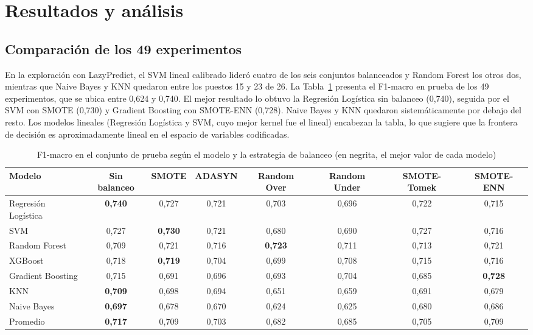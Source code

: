 \documentclass[conference]{IEEEtran}
\begin{document}
\section{Resultados y análisis}\label{sec:resultados}

\subsection{Comparación de los 49 experimentos}

En la exploración con LazyPredict, el SVM lineal calibrado lideró cuatro de los seis conjuntos balanceados y Random Forest los otros dos, mientras que Naive Bayes y KNN quedaron entre los puestos 15 y 23 de 26. La Tabla~\ref{tab:f1} presenta el F1-macro en prueba de los 49 experimentos, que se ubica entre 0,624 y 0,740. El mejor resultado lo obtuvo la Regresión Logística sin balanceo (0,740), seguida por el SVM con SMOTE (0,730) y Gradient Boosting con SMOTE-ENN (0,728). Naive Bayes y KNN quedaron sistemáticamente por debajo del resto. Los modelos lineales (Regresión Logística y SVM, cuyo mejor kernel fue el lineal) encabezan la tabla, lo que sugiere que la frontera de decisión es aproximadamente lineal en el espacio de variables codificadas.

\begin{table}[!t]
\caption{F1-macro en el conjunto de prueba según el modelo y la estrategia de balanceo (en negrita, el mejor valor de cada modelo)}
\label{tab:f1}
\centering
\footnotesize
\begin{tabular}{@{}lccccccc@{}}
\toprule
Modelo & Sin balanceo & SMOTE & ADASYN & Random Over & Random Under & SMOTE-Tomek & SMOTE-ENN \\
\midrule
Regresión Logística & \textbf{0,740} & 0,727 & 0,721 & 0,703 & 0,696 & 0,722 & 0,715 \\
SVM & 0,727 & \textbf{0,730} & 0,721 & 0,680 & 0,690 & 0,727 & 0,716 \\
Random Forest & 0,709 & 0,721 & 0,716 & \textbf{0,723} & 0,711 & 0,713 & 0,721 \\
XGBoost & 0,718 & \textbf{0,719} & 0,704 & 0,699 & 0,708 & 0,715 & 0,716 \\
Gradient Boosting & 0,715 & 0,691 & 0,696 & 0,693 & 0,704 & 0,685 & \textbf{0,728} \\
KNN & \textbf{0,709} & 0,698 & 0,694 & 0,651 & 0,659 & 0,691 & 0,679 \\
Naive Bayes & \textbf{0,697} & 0,678 & 0,670 & 0,624 & 0,625 & 0,680 & 0,686 \\
\midrule
Promedio & \textbf{0,717} & 0,709 & 0,703 & 0,682 & 0,685 & 0,705 & 0,709 \\
\bottomrule
\end{tabular}
\end{table}
\end{document}

